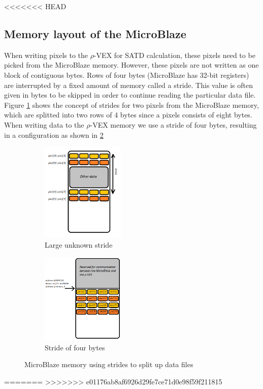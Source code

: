 <<<<<<< HEAD
\subsection{Memory layout of the MicroBlaze}

When writing pixels to the $\rho$-VEX for SATD calculation, these pixels need to be picked from the MicroBlaze memory. However, these pixels are not written as one block of contiguous bytes. Rows of four bytes (MicroBlaze has 32-bit registers) are interrupted by a fixed amount of memory called a stride. This value is often given in bytes to be skipped in order to continue reading the particular data file. Figure \ref{fig:stride} shows the concept of strides for two pixels from the MicroBlaze memory, which are splitted into two rows of 4 bytes since a pixels consists of eight bytes. When writing data to the $\rho$-VEX memory we use a stride of four bytes, resulting in a configuration as shown in \ref{fig:testpixels}


\begin{figure}[htb]
	\centering
	\begin{subfigure}{0.3\textwidth}
		\centering
		\includegraphics[width=150px]{Pictures/stride}
		\caption{Large unknown stride}
		\label{fig:stride}
	\end{subfigure}
	\quad
	\begin{subfigure}{0.3\textwidth}
		\centering
		\includegraphics[width=150px]{Pictures/pixels_dmem}
		\caption{Stride of four bytes}
		\label{fig:testpixels}
	\end{subfigure}
\caption{MicroBlaze memory using strides to split up data files}%
\label{}%
\end{figure}
=======
>>>>>>> e01176ab8af6926d29fe7ce71d0e98f59f211815
